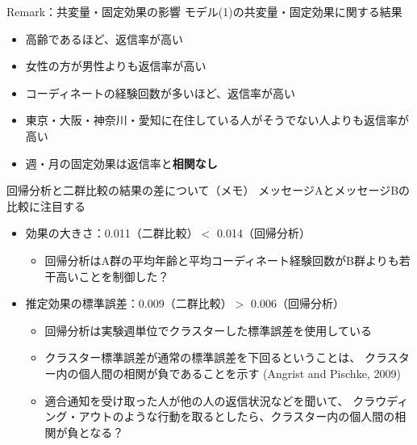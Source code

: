 \documentclass[
      aspectratio=169,
        12pt,
    ]{beamer}
\renewcommand{\textbf}[1]{{\color{DarkBlue}\bfseries#1}}
\providecommand{\tightlist}{%
  \setlength{\itemsep}{0pt}\setlength{\parskip}{0pt}}
\begin{document}
\begin{frame}{Remark：共変量・固定効果の影響}
\protect\hypertarget{remarkux5171ux5909ux91cfux56faux5b9aux52b9ux679cux306eux5f71ux97ff}{}
モデル(1)の共変量・固定効果に関する結果

\begin{itemize}
\tightlist
\item
  高齢であるほど、返信率が高い
\item
  女性の方が男性よりも返信率が高い
\item
  コーディネートの経験回数が多いほど、返信率が高い
\item
  東京・大阪・神奈川・愛知に在住している人がそうでない人よりも返信率が高い
\item
  週・月の固定効果は返信率と\textbf{相関なし}
\end{itemize}
\end{frame}

\begin{frame}{回帰分析と二群比較の結果の差について（メモ）}
\protect\hypertarget{ux56deux5e30ux5206ux6790ux3068ux4e8cux7fa4ux6bd4ux8f03ux306eux7d50ux679cux306eux5deeux306bux3064ux3044ux3066ux30e1ux30e2}{}
メッセージAとメッセージBの比較に注目する

\begin{itemize}
\tightlist
\item
  効果の大きさ：0.011（二群比較）\(<\) 0.014（回帰分析）

  \begin{itemize}
  \tightlist
  \item
    回帰分析はA群の平均年齢と平均コーディネート経験回数がB群よりも若干高いことを制御した？
  \end{itemize}
\item
  推定効果の標準誤差：0.009（二群比較）\(>\) 0.006（回帰分析）

  \begin{itemize}
  \tightlist
  \item
    回帰分析は実験週単位でクラスターした標準誤差を使用している
  \item
    クラスター標準誤差が通常の標準誤差を下回るということは、
    クラスター内の個人間の相関が負であることを示す (Angrist and Pischke, 2009)
  \item
    適合通知を受け取った人が他の人の返信状況などを聞いて、
    クラウディング・アウトのような行動を取るとしたら、クラスター内の個人間の相関が負となる？
  \end{itemize}
\end{itemize}
\end{frame}
\end{document}
